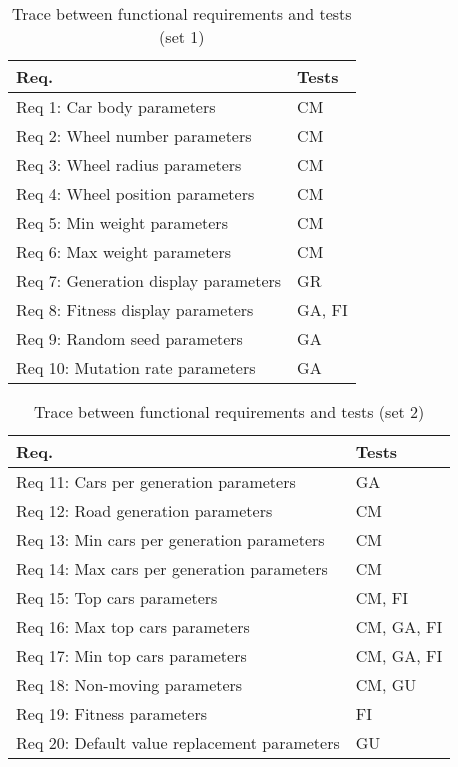 \documentclass[12pt, titlepage]{article}
\begin{document}
\begin{table}[H]
\centering
\begin{tabular}{p{} p{}}
\toprule
\textbf{Req.} & \textbf{Tests}\\
\midrule
Req 1: Car body parameters & CM \\
Req 2: Wheel number parameters & CM \\
Req 3: Wheel radius parameters & CM\\
Req 4: Wheel position parameters & CM\\
Req 5: Min weight parameters & CM\\
Req 6: Max weight parameters & CM\\
Req 7: Generation display parameters & GR\\
Req 8: Fitness display parameters & GA, FI\\
Req 9: Random seed parameters & GA\\
Req 10: Mutation rate parameters & GA\\
\bottomrule
\end{tabular}
\caption{Trace between functional requirements and tests (set 1)}
\label{TblRT}
\end{table}

\begin{table}[H]
\centering
\begin{tabular}{p{} p{}}
\toprule
\textbf{Req.} & \textbf{Tests}\\
\midrule
Req 11: Cars per generation parameters  & GA\\
Req 12: Road generation parameters & CM\\
Req 13: Min cars per generation parameters & CM\\
Req 14: Max cars per generation parameters & CM\\
Req 15: Top cars parameters & CM, FI\\
Req 16: Max top cars parameters & CM, GA, FI\\
Req 17: Min top cars parameters & CM, GA, FI\\
Req 18: Non-moving parameters & CM, GU\\
Req 19: Fitness parameters & FI\\
Req 20: Default value replacement parameters & GU\\
\bottomrule
\end{tabular}
\caption{Trace between functional requirements and tests (set 2)}
\label{TblRT2}
\end{table}
\end{document}
